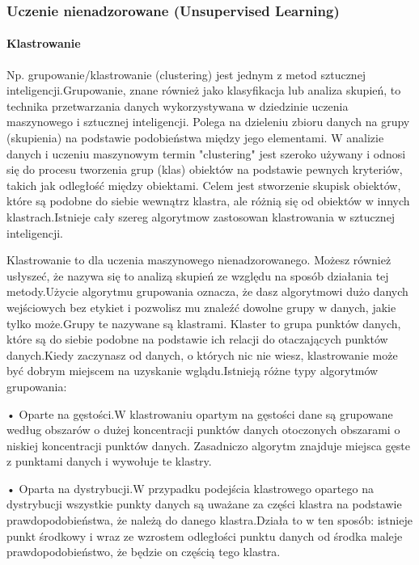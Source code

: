 \newpage
\subsubsection{Uczenie nienadzorowane (Unsupervised Learning) }
\paragraph{Klastrowanie}

 Np. grupowanie/klastrowanie (clustering) jest jednym z metod sztucznej inteligencji.Grupowanie, znane również jako klasyfikacja lub analiza skupień, to technika przetwarzania danych wykorzystywana w dziedzinie uczenia maszynowego i sztucznej inteligencji. Polega na dzieleniu zbioru danych na grupy (skupienia) na podstawie podobieństwa między jego elementami. W analizie danych i uczeniu maszynowym termin "clustering" jest szeroko używany i odnosi się do procesu tworzenia grup (klas) obiektów na podstawie pewnych kryteriów, takich jak odległość między obiektami. Celem jest stworzenie skupisk obiektów, które są podobne do siebie wewnątrz klastra, ale różnią się od obiektów w innych klastrach.Istnieje cały szereg algorytmow zastosowan klastrowania w sztucznej inteligencji.

  Klastrowanie to dla uczenia maszynowego nienadzorowanego. Możesz również usłyszeć, że nazywa się to analizą skupień ze względu na sposób działania tej metody.Użycie algorytmu grupowania oznacza, że dasz algorytmowi dużo danych wejściowych bez etykiet i pozwolisz mu znaleźć dowolne grupy w danych, jakie tylko może.Grupy te nazywane są klastrami. Klaster to grupa punktów danych, które są do siebie podobne na podstawie ich relacji do otaczających punktów danych.Kiedy zaczynasz od danych, o których nic nie wiesz, klastrowanie może być dobrym miejscem na uzyskanie wglądu.Istnieją różne typy algorytmów grupowania:
  
 •  Oparte na gęstości.W klastrowaniu opartym na gęstości dane są grupowane według obszarów o dużej koncentracji punktów danych otoczonych obszarami o niskiej koncentracji punktów danych. Zasadniczo algorytm znajduje miejsca gęste z punktami danych i wywołuje te klastry.

 •  Oparta na dystrybucji.W przypadku podejścia klastrowego opartego na dystrybucji wszystkie punkty danych są uważane za części klastra na podstawie prawdopodobieństwa, że należą do danego klastra.Działa to w ten sposób: istnieje punkt środkowy i wraz ze wzrostem odległości punktu danych od środka maleje prawdopodobieństwo, że będzie on częścią tego klastra.

